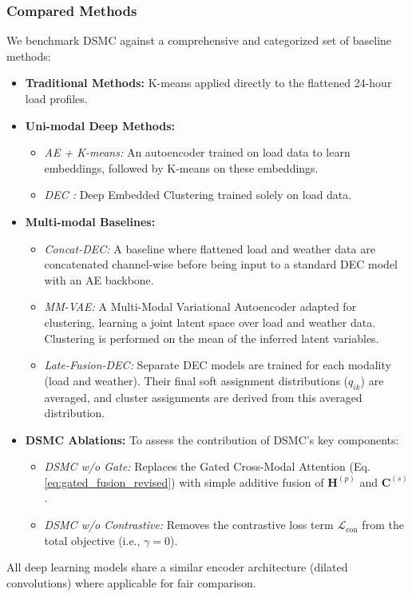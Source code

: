 \documentclass[journal]{IEEEtran}
\begin{document}
\subsubsection{Compared Methods}
We benchmark DSMC against a comprehensive and categorized set of baseline methods:
\begin{itemize}
    \item \textbf{Traditional Methods:} K-means applied directly to the flattened 24-hour load profiles.
    \item \textbf{Uni-modal Deep Methods:}
        \begin{itemize}
            \item \textit{AE + K-means:} An autoencoder trained on load data to learn embeddings, followed by K-means on these embeddings.
            \item \textit{DEC \cite{deep_embedding_clustering_xie}:} Deep Embedded Clustering trained solely on load data.
        \end{itemize}
    \item \textbf{Multi-modal Baselines:}
        \begin{itemize}
            \item \textit{Concat-DEC:} A baseline where flattened load and weather data are concatenated channel-wise before being input to a standard DEC model with an AE backbone.
            \item \textit{MM-VAE:} A Multi-Modal Variational Autoencoder \cite{mmvae_sutter} adapted for clustering, learning a joint latent space over load and weather data. Clustering is performed on the mean of the inferred latent variables.
            \item \textit{Late-Fusion-DEC:} Separate DEC models are trained for each modality (load and weather). Their final soft assignment distributions ($q_{ik}$) are averaged, and cluster assignments are derived from this averaged distribution.
        \end{itemize}
    \item \textbf{DSMC Ablations:} To assess the contribution of DSMC's key components:
        \begin{itemize}
            \item \textit{DSMC w/o Gate:} Replaces the Gated Cross-Modal Attention (Eq. \ref{eq:gated_fusion_revised}) with simple additive fusion of $\mathbf{H}^{(p)}$ and $\mathbf{C}^{(s)}$.
            \item \textit{DSMC w/o Contrastive:} Removes the contrastive loss term $\mathcal{L}_{\text{con}}$ from the total objective (i.e., $\gamma=0$).
        \end{itemize}
\end{itemize}
All deep learning models share a similar encoder architecture (dilated convolutions) where applicable for fair comparison.
\end{document}
